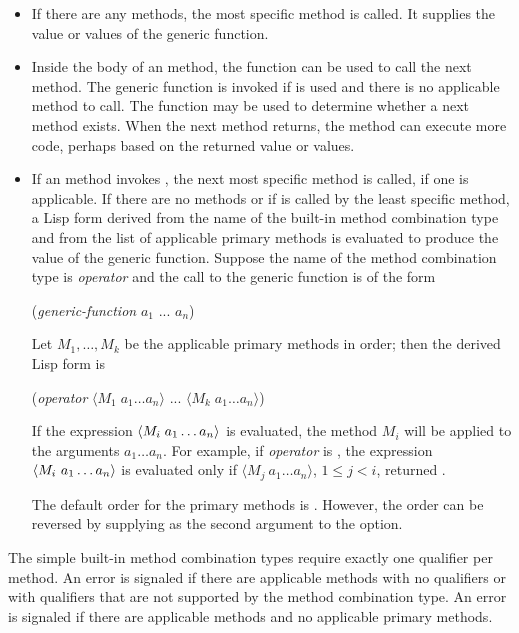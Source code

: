 \begin{itemize}
\item 
If there are any  methods, the most specific 
method is called.   It supplies the value or values of the generic function. 

\item  Inside the body of an  method, the function
 can be used to call the next method.  The
generic function  is invoked if 
 is used and there is no applicable method to call.
The function  may be used to determine whether a
next method exists. When the next method returns, the 
method can execute more code, perhaps based on the returned value or
values.

\item  If an  method invokes 
, the next most specific  method is
called, if one is applicable.  If there are no  methods
or if  is called by the least specific 
 method, a Lisp form derived from the name of the built-in
method combination type and from the list of applicable primary
methods is evaluated to produce the value of the generic function.
Suppose the name of the method combination type is \emph{operator}
and the call to the generic function is of the form
\begin{lisp}
(\emph{generic-function} $a_1$ ... $a_{n}$)
\end{lisp}
Let $M_1,\ldots,M_{k}$ be the applicable primary methods
in order; then the derived Lisp form is
\begin{lisp}
(\emph{operator} $\langle M_1\;a_1\ldots a_{n}\rangle$
... $\langle M_k\;a_1\ldots a_{n}\rangle$)
\end{lisp}
If the expression $\langle M_{i} \;a_1\ldots a_
{n}\rangle$ is
evaluated, the method $M_i$ will be applied to the arguments
$a_1\ldots a_{n}$.  
For example,
if \emph{operator} is ,
the expression $\langle M_{i} \ a_1\ldots a_{n}\rangle$ is
evaluated only if $\langle M_{j} \ a_1\ldots a_{n}\rangle$,
$1\leq j<i$, returned .

The default order for the primary methods is 
.  However, the order can be reversed by supplying
 as the second argument to the 
 option.
\end{itemize}

The simple built-in method combination types require exactly one qualifier per
method.  An error is signaled if there are applicable methods with no
qualifiers or with qualifiers that are not supported by the method
combination type. An error is signaled if there are applicable 
methods and no applicable primary methods.

